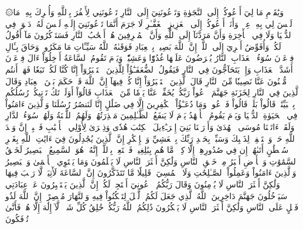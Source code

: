 ۞وَيَٰقَوۡمِ مَا لِيٓ أَدۡعُوكُمۡ إِلَى ٱلنَّجَوٰةِ وَتَدۡعُونَنِيٓ إِلَى ٱلنَّارِ
تَدۡعُونَنِي لِأَكۡفُرَ بِٱللَّهِ وَأُشۡرِكَ بِهِۦ مَا لَيۡسَ لِي بِهِۦ عِلۡمٞ وَأَنَا۠ أَدۡعُوكُمۡ إِلَى ٱلۡعَزِيزِ ٱلۡغَفَّـٰرِ
لَا جَرَمَ أَنَّمَا تَدۡعُونَنِيٓ إِلَيۡهِ لَيۡسَ لَهُۥ دَعۡوَةٞ فِي ٱلدُّنۡيَا وَلَا فِي ٱلۡأٓخِرَةِ وَأَنَّ مَرَدَّنَآ إِلَى ٱللَّهِ وَأَنَّ ٱلۡمُسۡرِفِينَ هُمۡ أَصۡحَٰبُ ٱلنَّارِ
فَسَتَذۡكُرُونَ مَآ أَقُولُ لَكُمۡۚ وَأُفَوِّضُ أَمۡرِيٓ إِلَى ٱللَّهِۚ إِنَّ ٱللَّهَ بَصِيرُۢ بِٱلۡعِبَادِ
فَوَقَىٰهُ ٱللَّهُ سَيِّـَٔاتِ مَا مَكَرُواْۖ وَحَاقَ بِـَٔالِ فِرۡعَوۡنَ سُوٓءُ ٱلۡعَذَابِ
ٱلنَّارُ يُعۡرَضُونَ عَلَيۡهَا غُدُوّٗا وَعَشِيّٗاۚ وَيَوۡمَ تَقُومُ ٱلسَّاعَةُ أَدۡخِلُوٓاْ ءَالَ فِرۡعَوۡنَ أَشَدَّ ٱلۡعَذَابِ
وَإِذۡ يَتَحَآجُّونَ فِي ٱلنَّارِ فَيَقُولُ ٱلضُّعَفَـٰٓؤُاْ لِلَّذِينَ ٱسۡتَكۡبَرُوٓاْ إِنَّا كُنَّا لَكُمۡ تَبَعٗا فَهَلۡ أَنتُم مُّغۡنُونَ عَنَّا نَصِيبٗا مِّنَ ٱلنَّارِ
قَالَ ٱلَّذِينَ ٱسۡتَكۡبَرُوٓاْ إِنَّا كُلّٞ فِيهَآ إِنَّ ٱللَّهَ قَدۡ حَكَمَ بَيۡنَ ٱلۡعِبَادِ
وَقَالَ ٱلَّذِينَ فِي ٱلنَّارِ لِخَزَنَةِ جَهَنَّمَ ٱدۡعُواْ رَبَّكُمۡ يُخَفِّفۡ عَنَّا يَوۡمٗا مِّنَ ٱلۡعَذَابِ
قَالُوٓاْ أَوَلَمۡ تَكُ تَأۡتِيكُمۡ رُسُلُكُم بِٱلۡبَيِّنَٰتِۖ قَالُواْ بَلَىٰۚ قَالُواْ فَٱدۡعُواْۗ وَمَا دُعَـٰٓؤُاْ ٱلۡكَٰفِرِينَ إِلَّا فِي ضَلَٰلٍ
إِنَّا لَنَنصُرُ رُسُلَنَا وَٱلَّذِينَ ءَامَنُواْ فِي ٱلۡحَيَوٰةِ ٱلدُّنۡيَا وَيَوۡمَ يَقُومُ ٱلۡأَشۡهَٰدُ
يَوۡمَ لَا يَنفَعُ ٱلظَّـٰلِمِينَ مَعۡذِرَتُهُمۡۖ وَلَهُمُ ٱللَّعۡنَةُ وَلَهُمۡ سُوٓءُ ٱلدَّارِ
وَلَقَدۡ ءَاتَيۡنَا مُوسَى ٱلۡهُدَىٰ وَأَوۡرَثۡنَا بَنِيٓ إِسۡرَـٰٓءِيلَ ٱلۡكِتَٰبَ
هُدٗى وَذِكۡرَىٰ لِأُوْلِي ٱلۡأَلۡبَٰبِ
فَٱصۡبِرۡ إِنَّ وَعۡدَ ٱللَّهِ حَقّٞ وَٱسۡتَغۡفِرۡ لِذَنۢبِكَ وَسَبِّحۡ بِحَمۡدِ رَبِّكَ بِٱلۡعَشِيِّ وَٱلۡإِبۡكَٰرِ
إِنَّ ٱلَّذِينَ يُجَٰدِلُونَ فِيٓ ءَايَٰتِ ٱللَّهِ بِغَيۡرِ سُلۡطَٰنٍ أَتَىٰهُمۡ إِن فِي صُدُورِهِمۡ إِلَّا كِبۡرٞ مَّا هُم بِبَٰلِغِيهِۚ فَٱسۡتَعِذۡ بِٱللَّهِۖ إِنَّهُۥ هُوَ ٱلسَّمِيعُ ٱلۡبَصِيرُ
لَخَلۡقُ ٱلسَّمَٰوَٰتِ وَٱلۡأَرۡضِ أَكۡبَرُ مِنۡ خَلۡقِ ٱلنَّاسِ وَلَٰكِنَّ أَكۡثَرَ ٱلنَّاسِ لَا يَعۡلَمُونَ
وَمَا يَسۡتَوِي ٱلۡأَعۡمَىٰ وَٱلۡبَصِيرُ وَٱلَّذِينَ ءَامَنُواْ وَعَمِلُواْ ٱلصَّـٰلِحَٰتِ وَلَا ٱلۡمُسِيٓءُۚ قَلِيلٗا مَّا تَتَذَكَّرُونَ
إِنَّ ٱلسَّاعَةَ لَأٓتِيَةٞ لَّا رَيۡبَ فِيهَا وَلَٰكِنَّ أَكۡثَرَ ٱلنَّاسِ لَا يُؤۡمِنُونَ
وَقَالَ رَبُّكُمُ ٱدۡعُونِيٓ أَسۡتَجِبۡ لَكُمۡۚ إِنَّ ٱلَّذِينَ يَسۡتَكۡبِرُونَ عَنۡ عِبَادَتِي سَيَدۡخُلُونَ جَهَنَّمَ دَاخِرِينَ
ٱللَّهُ ٱلَّذِي جَعَلَ لَكُمُ ٱلَّيۡلَ لِتَسۡكُنُواْ فِيهِ وَٱلنَّهَارَ مُبۡصِرًاۚ إِنَّ ٱللَّهَ لَذُو فَضۡلٍ عَلَى ٱلنَّاسِ وَلَٰكِنَّ أَكۡثَرَ ٱلنَّاسِ لَا يَشۡكُرُونَ
ذَٰلِكُمُ ٱللَّهُ رَبُّكُمۡ خَٰلِقُ كُلِّ شَيۡءٖ لَّآ إِلَٰهَ إِلَّا هُوَۖ فَأَنَّىٰ تُؤۡفَكُونَ
